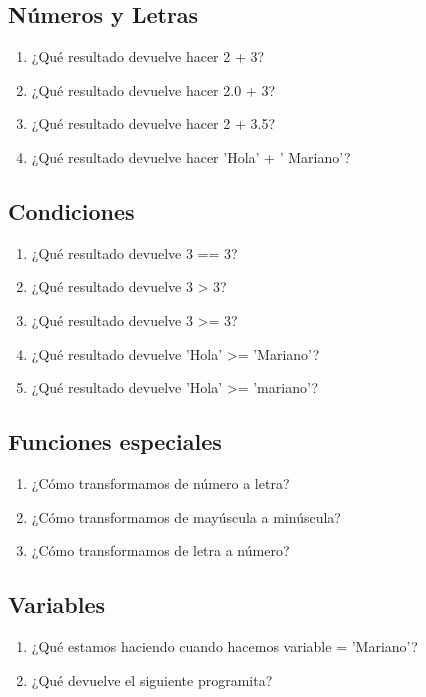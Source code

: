 \subsection{Números y Letras}
\begin{enumerate}
  \item ¿Qué resultado devuelve hacer 2 + 3?
  \item ¿Qué resultado devuelve hacer 2.0 + 3?
  \item ¿Qué resultado devuelve hacer 2 + 3.5?
  \item ¿Qué resultado devuelve hacer 'Hola' + ' Mariano'?
\end{enumerate}

\subsection{Condiciones}
\begin{enumerate}
  \item ¿Qué resultado devuelve 3 == 3?
  \item ¿Qué resultado devuelve 3 > 3?
  \item ¿Qué resultado devuelve 3 >= 3?
  \item ¿Qué resultado devuelve 'Hola' >= 'Mariano'?
  \item ¿Qué resultado devuelve 'Hola' >= 'mariano'?
\end{enumerate}

\subsection{Funciones especiales}
\begin{enumerate}
  \item ¿Cómo transformamos de número a letra?
  \item ¿Cómo transformamos de mayúscula a minúscula?
  \item ¿Cómo transformamos de letra a número?
\end{enumerate}

\subsection{Variables}
\begin{enumerate}
  \item ¿Qué estamos haciendo cuando hacemos variable = 'Mariano'?
  \item ¿Qué devuelve el siguiente programita?
\end{enumerate}

